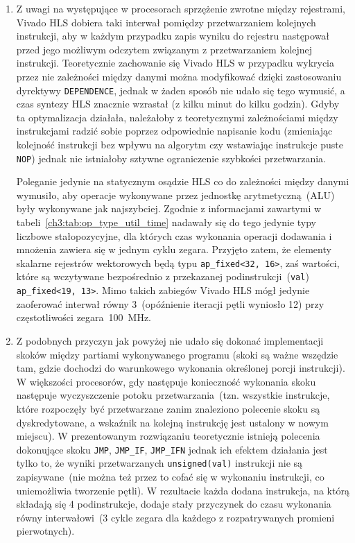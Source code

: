 \begin{enumerate}
\item Z uwagi na występujące w procesorach sprzężenie zwrotne między rejestrami, Vivado HLS dobiera taki interwał pomiędzy przetwarzaniem kolejnych instrukcji, aby w każdym przypadku zapis wyniku do rejestru następował przed jego możliwym odczytem związanym z przetwarzaniem kolejnej instrukcji. Teoretycznie zachowanie się Vivado HLS w przypadku wykrycia przez nie zależności między danymi można modyfikować dzięki zastosowaniu dyrektywy \texttt{DEPENDENCE}, jednak w żaden sposób nie udało się tego wymusić, a czas syntezy HLS znacznie wzrastał (z kilku minut do kilku godzin). Gdyby ta optymalizacja działała, należałoby z teoretycznymi zależnościami między instrukcjami radzić sobie poprzez odpowiednie napisanie kodu (zmieniając kolejność instrukcji bez wpływu na algorytm czy wstawiając instrukcje puste \texttt{NOP}) jednak nie istniałoby sztywne ograniczenie szybkości przetwarzania. 

Poleganie jedynie na statycznym osądzie HLS co do zależności między danymi wymusiło, aby operacje wykonywane przez jednostkę arytmetyczną~(ALU) były wykonywane jak najszybciej. Zgodnie z informacjami zawartymi w tabeli~\ref{ch3:tab:op_type_util_time} nadawały się do tego jedynie typy liczbowe stałopozycyjne, dla których czas wykonania operacji dodawania i mnożenia zawiera się w jednym cyklu zegara. Przyjęto zatem, że elementy skalarne rejestrów wektorowych będą typu \texttt{ap\_fixed<32, 16>}, zaś wartości, które są wczytywane bezpośrednio z przekazanej podinstrukcji~(\texttt{val}) \texttt{ap\_fixed<19, 13>}. Mimo takich zabiegów Vivado HLS mógł jedynie zaoferować interwał równy 3~(opóźnienie iteracji pętli wyniosło 12) przy częstotliwości zegara~100~MHz. 

\item Z podobnych przyczyn jak powyżej nie udało się dokonać implementacji skoków między partiami wykonywanego programu (skoki są ważne wszędzie tam, gdzie dochodzi do warunkowego wykonania określonej porcji instrukcji). W większości procesorów, gdy następuje konieczność wykonania skoku następuje wyczyszczenie potoku przetwarzania~(tzn. wszystkie instrukcje, które rozpoczęły być przetwarzane zanim znaleziono polecenie skoku są dyskredytowane, a wskaźnik na kolejną instrukcję jest ustalony w nowym miejscu). W prezentowanym rozwiązaniu teoretycznie istnieją polecenia dokonujące skoku \texttt{JMP}, \texttt{JMP\_IF}, \texttt{JMP\_IFN} jednak ich efektem działania jest tylko to, że wyniki przetwarzanych \texttt{unsigned(val)} instrukcji nie są zapisywane~(nie można też przez to cofać się w wykonaniu instrukcji, co uniemożliwia tworzenie pętli). W rezultacie każda dodana instrukcja, na którą składają się 4 podinstrukcje, dodaje stały przyczynek do czasu wykonania równy interwałowi~(3 cykle zegara dla każdego z rozpatrywanych promieni pierwotnych). 


\end{enumerate}

